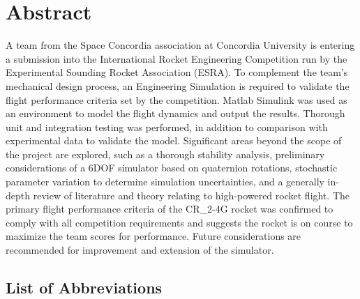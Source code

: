 \documentclass[]{article}
\begin{document}
\section*{Abstract}
A team from the Space Concordia association at Concordia University is
entering a submission into the International Rocket Engineering
Competition run by the Experimental Sounding Rocket Association (ESRA).
To complement the team's mechanical design process, an Engineering
Simulation is required to validate the flight performance criteria set
by the competition. Matlab Simulink was used as an environment to model
the flight dynamics and output the results. Thorough unit and
integration testing was performed, in addition to comparison with
experimental data to validate the model. Significant areas beyond the
scope of the project are explored, such as a thorough stability
analysis, preliminary considerations of a 6DOF simulator based on
quaternion rotations, stochastic parameter variation to determine
simulation uncertainties, and a generally in-depth review of literature
and theory relating to high-powered rocket flight. The primary flight
performance criteria of the CR\_2-4G rocket was confirmed to comply with
all competition requirements and suggests the rocket is on course to
maximize the team scores for performance. Future considerations are
recommended for improvement and extension of the simulator.
\clearpage

{
\hypersetup{linkcolor=black}
\setcounter{tocdepth}{3}
\tableofcontents
\clearpage
}


\listoftables
\listoffigures
\clearpage
\subsection{List of Abbreviations}\label{list-of-abbreviations}
\end{document}
